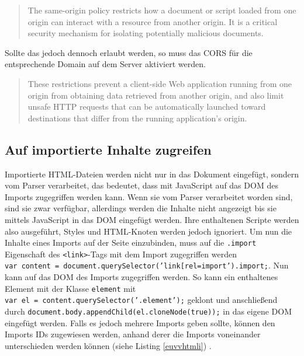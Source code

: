 \begin{quote}
The same-origin policy restricts how a document or script loaded from one origin can interact with a resource from another origin. It is a critical security mechanism for isolating potentially malicious documents. \cite{citeulike:13853253}
\end{quote}

Sollte das jedoch dennoch erlaubt werden, so muss das \ac{CORS} für die entsprechende Domain auf dem Server aktiviert werden.

\begin{quote}
These restrictions prevent a client-side Web application running from one origin from obtaining data retrieved from another origin, and also limit unsafe \ac{HTTP} requests that can be automatically launched toward destinations that differ from the running application's origin. \cite{citeulike:13853643}
\end{quote}


\subsection{Auf importierte Inhalte zugreifen}\label{html-imports-verwenden}

Importierte \ac{HTML}-Dateien werden nicht nur in das Dokument eingefügt, sondern vom Parser verarbeitet, das bedeutet, dass mit JavaScript auf das \ac{DOM} des Imports zugegriffen werden kann. Wenn sie vom Parser verarbeitet worden sind, sind sie zwar verfügbar, allerdings werden die Inhalte nicht angezeigt bis sie mittels JavaScript in das \ac{DOM} eingefügt werden. Ihre enthaltenen Scripte werden also ausgeführt, Styles und \ac{HTML}-Knoten werden jedoch ignoriert. Um nun die Inhalte eines Imports auf der Seite einzubinden, muss auf die \texttt{.import} Eigenschaft des \texttt{\textless{}link\textgreater{}}-Tags mit dem Import zugegriffen werden \texttt{var\ content\ =\ document.querySelector('link{[}rel=\dq import\dq{]}').import;}. Nun kann auf das \ac{DOM} des Imports zugegriffen werden. So kann ein enthaltenes Element mit der Klasse \texttt{element} mit \texttt{var\ el\ =\ content.querySelector('.element');} geklont und anschließend durch \texttt{document.body.appendChild(el.cloneNode(true));} in das eigene \ac{DOM} eingefügt werden. Falls es jedoch mehrere Imports geben sollte, können den Imports IDs zugewiesen werden, anhand derer die Imports voneinander unterschieden werden können (siehe Listing \ref{euvvhtmli}) \cite{citeulike:13853724}.




